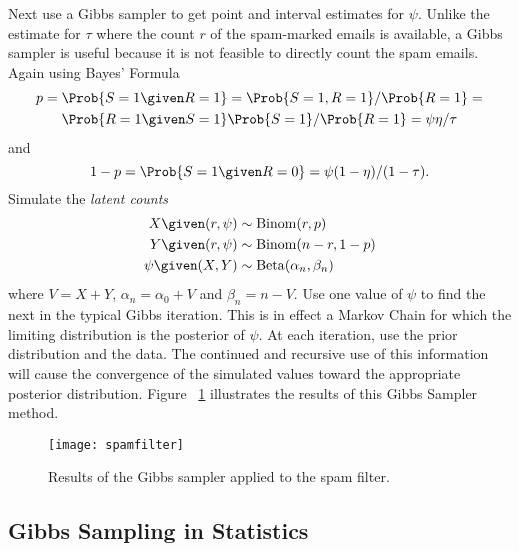 \documentclass[12pt]{article}
\begin{document}
Next use a Gibbs sampler to get point and interval estimates for \( \psi
\).  Unlike the estimate for \( \tau \) where the count \( r \) of the
spam-marked emails is available, a Gibbs sampler is useful because it is
not feasible to directly count the spam emails.  Again using Bayes'
Formula
\begin{multline*}
    p = \Prob{S=1 \given R = 1} = \Prob{S=1, R = 1}/\Prob{R = 1} = \\
    \Prob{R = 1 \given S=1} \Prob{S = 1}/\Prob{R = 1} = \psi\eta/\tau
\end{multline*}
and
\[
    1 - p = \Prob{S=1 \given R = 0} = \psi(1-\eta)/(1-\tau).
\] Simulate the \emph{latent counts}
\begin{align*}
    X \given (r,\psi) &\sim
    \operatorname{Binom}
    (r, p) \\
    Y \given (r,\psi) &\sim
    \operatorname{Binom}
    (n-r, 1-p) \\
    \psi \given (X,Y) &\sim
    \operatorname{Beta}
    (\alpha_n, \beta_n) \\
\end{align*}
where \( V = X + Y \), \( \alpha_n = \alpha_0 + V \) and \( \beta_n = n
- V \).  Use one value of \( \psi \) to find the next in the typical
Gibbs iteration.  This is in effect a Markov Chain for which the
limiting distribution is the posterior of \( \psi \).  At each
iteration, use the prior distribution and the data.  The continued and
recursive use of this information will cause the convergence of the
simulated values toward the appropriate posterior distribution.  Figure~%
\ref{fig:gibbsampler:spamfilter} illustrates the results of this Gibbs
Sampler method.

\begin{figure}
    \centering
    \texttt{[image: spamfilter]}
    \caption{Results of the Gibbs sampler applied to the spam filter.}%
    \label{fig:gibbsampler:spamfilter}
\end{figure}

\subsection*{Gibbs Sampling in Statistics}
\end{document}
